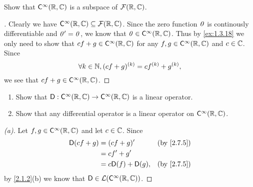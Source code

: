 \exercisesection

\setcounter{ex}{4}
\begin{ex}\label{ex:2.7.5}
	Show that \(\cfs[\infty](\R, \C)\) is a subspace of \(\mathcal{F}(\mathbb{R}, \mathbb{C})\).
\end{ex}

\begin{proof}[]
	Clearly we have \(\cfs[\infty](\R, \C) \subseteq \fs(\R, \C)\).
	Since the zero function \(\mathit{0}\) is continously differentiable and \(\mathit{0}' = \mathit{0}\), we know that \(\zv \in \cfs[\infty](\R, \C)\).
	Thus by \cref{ex:1.3.18} we only need to show that \(cf + g \in \cfs[\infty](\R, \C)\) for any \(f, g \in \cfs[\infty](\R, \C)\) and \(c \in \mathbb{C}\).
	Since
	\[
		\forall k \in \mathbb{N}, (cf + g)^{(k)} = c f^{(k)} + g^{(k)},
	\]
	we see that \(cf + g \in \cfs[\infty](\R, \C)\).
\end{proof}

\begin{ex}\label{ex:2.7.6}
	\begin{enumerate}
		\item Show that \(\Dop : \cfs[\infty](\R, \C) \to \cfs[\infty](\R, \C)\) is a linear operator.
		\item Show that any differential operator is a linear operator on \(\cfs[\infty](\R, \C)\).
	\end{enumerate}
\end{ex}

\begin{proof}[(a)]
	Let \(f, g \in \cfs[\infty](\R, \C)\) and let \(c \in \mathbb{C}\).
	Since
	\begin{align*}
		\Dop(cf + g) & = (cf + g)'            &  & \by{2.7.5} \\
		             & = c f' + g'                            \\
		             & = c \Dop(f) + \Dop(g), &  & \by{2.7.5}
	\end{align*}
	by \cref{2.1.2}(b) we know that \(\Dop \in \ls(\cfs[\infty](\R, \C))\).
\end{proof}

